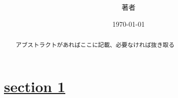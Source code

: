 \documentclass[a4paper,11pt]{ltjsarticle}
\title{%
  \bfseries\papertitlejp\\[0.5em]
  {\normalfont\large\papertitleen}%
  \ifdefempty{\paperarxivurl}{}{\\[0.4em]{\normalfont\normalsize
    \href{\paperarxivurl}{\paperarxivlabel}}}%
  \ifdefempty{\paperinspireurl}{}{\\[0.4em]{\normalfont\normalsize
    \href{\paperinspireurl}{\paperinspirelabel}}}%
}
\author{著者}
\date{\today}
\newcommand{\sectionlink}[1]{\section[#1]{\hyperlink{toc}{#1}}}
\numberwithin{equation}{section}
\begin{document}
\maketitle

\begin{abstract}
アブストラクトがあればここに記載、必要なければ抜き取る
\end{abstract}


\hypertarget{toc}{}
\tableofcontents
\clearpage

\sectionlink{section 1}

\newpage
\renewcommand{\refname}{\hyperlink{toc}{参考文献}}
%

\newpage
\appendix
\renewcommand{\theequation}{\Alph{section}.\arabic{equation}}

\end{document}
